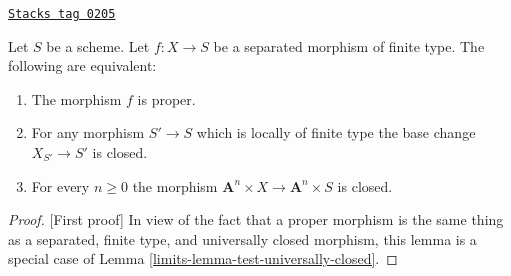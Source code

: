 \begin{lemma}
\label{limits-lemma-limited-base-change}
\href{https://stacks.math.columbia.edu/tag/0205}{\texttt{Stacks tag 0205}}

Let $S$ be a scheme.
Let $f : X \to S$ be a separated morphism of finite type.
The following are equivalent:
\begin{enumerate}
\item The morphism $f$ is proper.
\item For any morphism $S' \to S$ which is locally of finite type
the base change $X_{S'} \to S'$ is closed.
\item For every $n \geq 0$ the morphism
$\mathbf{A}^n \times X \to \mathbf{A}^n \times S$ is closed.
\end{enumerate}
\end{lemma}

\begin{proof}
[First proof]
In view of the fact that a proper morphism is the same thing as
a separated, finite type, and universally closed morphism, this
lemma is a special case of Lemma \ref{limits-lemma-test-universally-closed}.
\end{proof}

